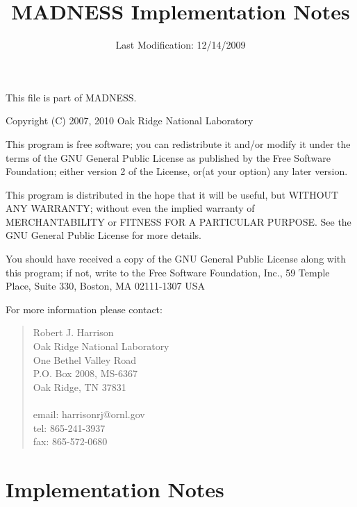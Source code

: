 \documentclass[letterpaper]{book}
\begin{document}
\title{MADNESS Implementation Notes}
\date{Last Modification: 12/14/2009}
\maketitle

\pagestyle{empty}
\null\vfill
\noindent
This file is part of MADNESS.


Copyright (C) 2007, 2010 Oak Ridge National Laboratory

This program is free software; you can redistribute it and/or modify it under the terms of the GNU General Public
License as published by the Free Software Foundation; either version 2 of the License, or(at your option) any later
version.

This program is distributed in the hope that it will be useful, but WITHOUT ANY WARRANTY; without even the implied
warranty of MERCHANTABILITY or FITNESS FOR A PARTICULAR PURPOSE. See the GNU General Public License for more details.

You should have received a copy of the GNU General Public License along with this program; if not, write to the Free
Software Foundation, Inc., 59 Temple Place, Suite 330, Boston, MA 02111-1307 USA

For more information please contact:
\begin{quote}							
Robert J. Harrison 				\\
Oak Ridge National Laboratory 	\\
One Bethel Valley Road 			\\
P.O. Box 2008, MS-6367			\\
Oak Ridge, TN 37831				\\
								\\
email: harrisonrj@ornl.gov 		\\
tel: 865-241-3937				\\
fax: 865-572-0680	
\end{quote}		
\newpage


\clearpage
\setcounter{page}{1}

\setcounter{tocdepth}{10}
\renewcommand\contentsname{Table of Contents}
\tableofcontents


\clearpage
\setcounter{page}{1}

\chapter{Implementation Notes}
\end{document}
